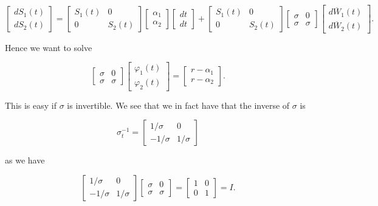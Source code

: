 \documentclass[
]{article}
\begin{document}
\[
\begin{bmatrix}
dS_1(t)\\
dS_2(t)
\end{bmatrix}
=
\begin{bmatrix}
S_1(t) & 0\\
0 & S_2(t)
\end{bmatrix}
\begin{bmatrix}
\alpha_1\\
\alpha_2
\end{bmatrix}
\begin{bmatrix}
dt\\
dt
\end{bmatrix}
+
\begin{bmatrix}
S_1(t) & 0\\
0 & S_2(t)
\end{bmatrix}
\begin{bmatrix}
\sigma & 0\\
\sigma & \sigma
\end{bmatrix}
\begin{bmatrix}
d\overline{W}_1(t)\\
d\overline{W}_2(t)
\end{bmatrix}.
\]

Hence we want to solve

\[
\begin{bmatrix}
\sigma & 0\\
\sigma & \sigma
\end{bmatrix}\begin{bmatrix}
\varphi_1(t)\\
\varphi_2(t)
\end{bmatrix}=
\begin{bmatrix}
r-\alpha_1\\
r-\alpha_2
\end{bmatrix}.
\]

This is easy if \(\sigma\) is invertible. We see that we in fact have
that the inverse of \(\sigma\) is

\[
\sigma_t^{-1}=\begin{bmatrix}
1/\sigma & 0\\
-1/\sigma & 1/\sigma
\end{bmatrix}
\]

as we have

\[
\begin{bmatrix}
1/\sigma & 0\\
-1/\sigma & 1/\sigma
\end{bmatrix}
\begin{bmatrix}
\sigma & 0\\
\sigma & \sigma
\end{bmatrix}=
\begin{bmatrix}
1 & 0\\
0 & 1
\end{bmatrix}=I.
\]
\end{document}
